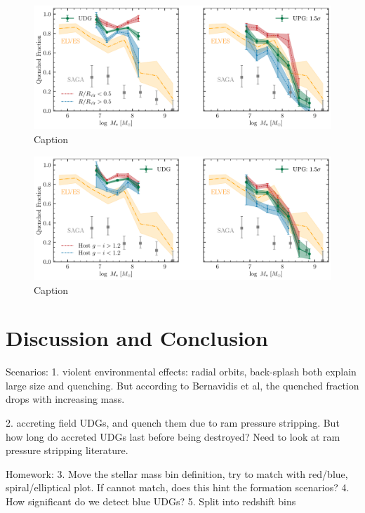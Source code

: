 \documentclass[twocolumn,astrosymb,twocolappendix]{aastex631}
\begin{document}
\begin{CJK*}{UTF8}{gbsn}
\begin{figure}
	\vbox{ 
		\centering
		\includegraphics[width=1\linewidth]{quenched_frac_dist2host.pdf}
	}
    \caption{Caption}
    \label{fig:qfrac_dist2host}
\end{figure}

\begin{figure}
	\vbox{ 
		\centering
		\includegraphics[width=1\linewidth]{quenched_frac_host_color.pdf}
	}
    \caption{Caption}
    \label{fig:qfrac_host_color}
\end{figure}

\section{Discussion and Conclusion}
Scenarios:
1. violent environmental effects: radial orbits, back-splash both explain large size and quenching. But according to Bernavidis et al, the quenched fraction drops with increasing mass. 

2. accreting field UDGs, and quench them due to ram pressure stripping. But how long do accreted UDGs last before being destroyed? Need to look at ram pressure stripping literature.

Homework:
3. Move the stellar mass bin definition, try to match with red/blue, spiral/elliptical plot. If cannot match, does this hint the formation scenarios?
4. How significant do we detect blue UDGs? 
5. Split into redshift bins



\end{CJK*}
\end{document}
